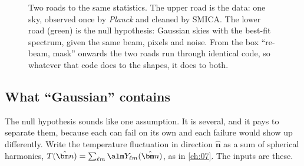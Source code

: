 \begin{figure}[htbp]
\centering
{}
\caption{Two roads to the same statistics. The upper road is the data: one sky, observed once by
\textit{Planck} and cleaned by SMICA. The lower road (green) is the null hypothesis: Gaussian skies with the
best-fit spectrum, given the same beam, pixels and noise. From the box ``re-beam, mask'' onwards the two roads
run through identical code, so whatever that code does to the shapes, it does to both.}
\label{13b:fig:roads}
\end{figure}

\subsection{What ``Gaussian'' contains}
\label{13b:sec:inputs}

The null hypothesis sounds like one assumption. It is several, and it pays to separate them, because each
can fail on its own and each failure would show up differently. Write the temperature fluctuation in direction
$\hat{\bm n}$ as a sum of spherical harmonics, $T(\hat{\bm n})=\sum_{\ell m}\alm Y_{\ell m}(\hat{\bm n})$,
as in \cref{ch:07}. The inputs are these.

